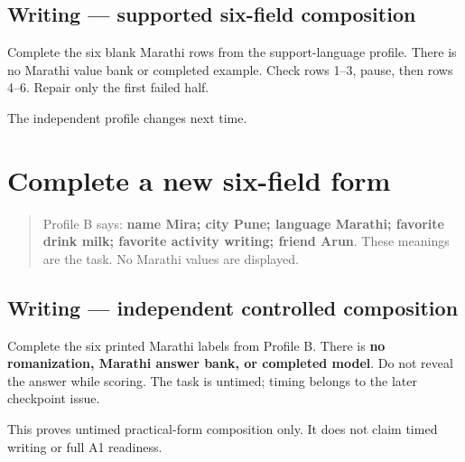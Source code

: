 \subsection*{Writing — supported six-field composition}
Complete the six blank Marathi rows from the support-language profile. There is no Marathi value bank or completed example. Check rows 1–3, pause, then rows 4–6. Repair only the first failed half.

\begin{tcolorbox}[breakable,colback=teal!4,colframe=teal!35!black,title={Before you move on}]
The independent profile changes next time.
\end{tcolorbox}
\section[independent six-field Marathi profile]{Complete a new six-field form}

\label{lesson:MR-A1F13-six-field-independent}



\begin{quote}
Profile B says: \textbf{name Mira; city Pune; language Marathi; favorite drink milk; favorite activity writing; friend Arun}. These meanings are the task. No Marathi values are displayed.
\end{quote}

\subsection*{Writing — independent controlled composition}
Complete the six printed Marathi labels from Profile B. There is \textbf{no romanization, Marathi answer bank, or completed model}. Do not reveal the answer while scoring. The task is untimed; timing belongs to the later checkpoint issue.

\begin{tcolorbox}[breakable,colback=teal!4,colframe=teal!35!black,title={Before you move on}]
This proves untimed practical-form composition only. It does not claim timed writing or full A1 readiness.
\end{tcolorbox}
